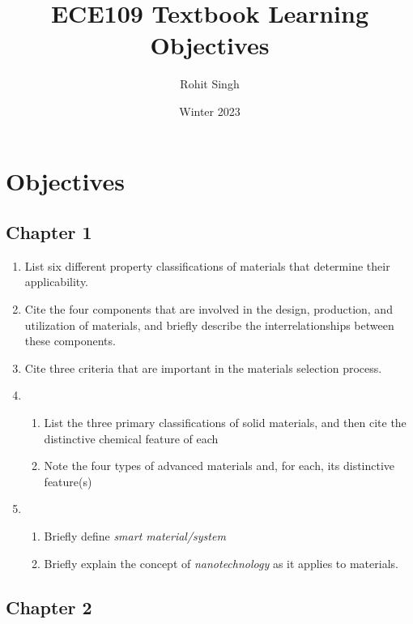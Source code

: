 \documentclass{article}
\title{ECE109 Textbook Learning Objectives}
\author{Rohit Singh}
\date{Winter 2023}
\begin{document}
\maketitle

\tableofcontents

\section{Objectives}

\subsection{Chapter 1}

\begin{enumerate}
    \item List six different property classifications of materials that determine their applicability.
    \item Cite the four components that are involved in the design, production, and utilization of materials, and briefly describe the interrelationships between these components.
    \item Cite three criteria that are important in the materials selection process.
    \item \begin{enumerate}
        \item List the three primary classifications of solid materials, and then cite the distinctive chemical feature of each
        \item Note the four types of advanced materials and, for each, its distinctive feature(s)
    \end{enumerate}
    \item \begin{enumerate}
        \item Briefly define \emph{smart material/system}
        \item Briefly explain the concept of \emph{nanotechnology} as it applies to materials.
    \end{enumerate}
\end{enumerate}

\subsection{Chapter 2}
\end{document}
